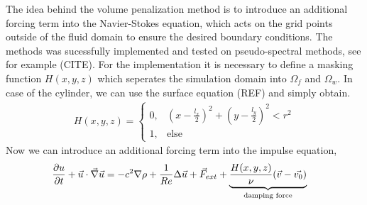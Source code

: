 \begin{figure}[!b]
    \label{fig:example}%
\end{figure}

The idea behind the volume penalization method is to introduce an additional forcing term into the Navier-Stokes equation, which acts on
the grid points outside of the fluid domain to ensure the desired boundary conditions. The methods was sucessfully implemented and tested
on pseudo-spectral methods, see for example (CITE).
For the implementation it is necessary to define a masking function $H(x, y, z)$ which seperates the simulation domain into $\Omega_f$ and $\Omega_w$.
In case of the cylinder, we can use the surface equation (REF) and simply obtain.
\begin{align}
H(x, y, z) = \begin{cases}
                    0, &  \left(x - \frac{l_x}{2}\right)^2 + \left(y - \frac{l_y}{2}\right)^2 <r^2\\
                    1, & \text{else}
             \end{cases}
\end{align}
Now we can introduce an additional forcing term into the impulse equation,
\begin{align}
    \pdn[u]{t} + \vec{u} \cdot \vec{\nabla} \vec{u} &= -c^2 \nabla \rho + \frac{1}{Re} \Delta \vec{u} + \vec{F}_{ext}
     +\underbrace{ \frac{H(x, y, z)}{\nu}(\vec{v} - \vec{v_0})}_{\text{damping force}}
\end{align}


